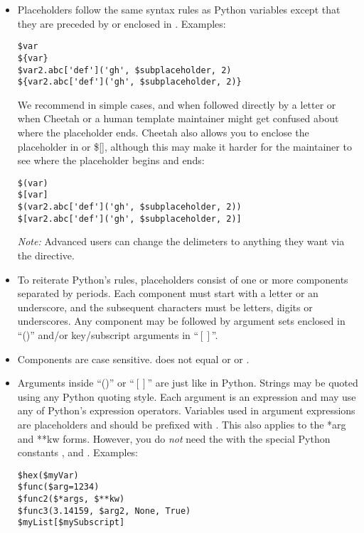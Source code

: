 \begin{itemize} 

\item Placeholders follow the same syntax rules as Python variables except
     that they are preceded by \code{\$} or enclosed in \code{\$\{\}}.
     Examples:
\begin{verbatim}
$var                                        
${var}                                      
$var2.abc['def']('gh', $subplaceholder, 2)  
${var2.abc['def']('gh', $subplaceholder, 2)}
\end{verbatim}
     We recommend \code{\$} in simple cases, and \code{\$\{\}} when followed
     directly by a letter or when Cheetah or a human template maintainer might
     get confused about where the placeholder ends.  Cheetah also allows you
     to enclose the placeholder in \code{\$()} or \$[], although this may make
     it harder for the maintainer to see where the placeholder begins and ends:
\begin{verbatim}
$(var)                                      
$[var]                                      
$(var2.abc['def']('gh', $subplaceholder, 2))
$[var2.abc['def']('gh', $subplaceholder, 2)]
\end{verbatim}
     {\em Note:} Advanced users can change the delimeters to anything they
     want via the  directive.

\item To reiterate Python's rules, placeholders consist of one or more
     components separated by periods.  Each component must start with a letter
     or an underscore, and the subsequent characters must be letters, digits or
     underscores.  Any component may be followed by argument sets enclosed in
     ``()'' and/or key/subscript arguments in ``$[]$''.

\item Components are case sensitive.  does not equal 
     or  or .     
     
\item Arguments inside ``()'' or ``$[]$'' are just like in Python.  Strings may
     be quoted using any Python quoting style.  Each argument is an expression
     and may use any of Python's expression operators.  Variables used in
     argument expressions are placeholders and should be prefixed with 
     \code{\$}.  This also applies to the *arg and **kw forms.  
     However, you do {\em not} need the \code{\$} with the special Python
     constants ,  and .
     Examples:
\begin{verbatim}
$hex($myVar)
$func($arg=1234)
$func2($*args, $**kw)
$func3(3.14159, $arg2, None, True)
$myList[$mySubscript]
\end{verbatim}
    

\end{itemize}
